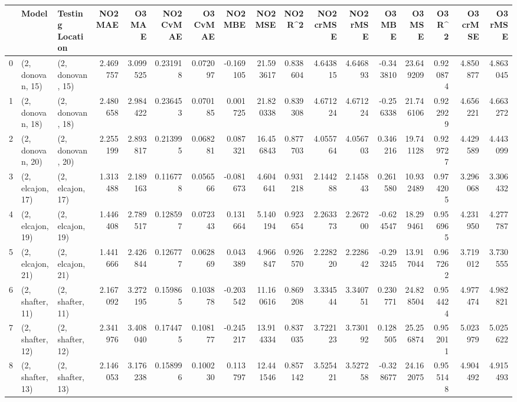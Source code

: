\begin{tabular}{lllrrrrrrrrrrrrrr}
\toprule
{} &             Model &  Testing Location &   NO2 MAE &    O3 MAE &  NO2 CvMAE &  O3 CvMAE &   NO2 MBE &    NO2 MSE &   NO2 R\textasciicircum2 &  NO2 crMSE &  NO2 rMSE &    O3 MBE &     O3 MSE &    O3 R\textasciicircum2 &  O3 crMSE &   O3 rMSE \\
\midrule
0  &  (2, donovan, 15) &  (2, donovan, 15) &  2.469757 &  3.099525 &   0.231918 &  0.072097 & -0.169105 &  21.593617 &  0.838604 &   4.643815 &  4.646893 & -0.343810 &  23.649209 &  0.920874 &  4.850877 &  4.863045 \\
1  &  (2, donovan, 18) &  (2, donovan, 18) &  2.480658 &  2.984422 &   0.236453 &  0.070185 &  0.001725 &  21.820338 &  0.839308 &   4.671224 &  4.671224 & -0.256338 &  21.746106 &  0.922929 &  4.656221 &  4.663272 \\
2  &  (2, donovan, 20) &  (2, donovan, 20) &  2.255199 &  2.893817 &   0.213995 &  0.068281 &  0.087321 &  16.456843 &  0.877703 &   4.055764 &  4.056703 &  0.346216 &  19.741128 &  0.929727 &  4.429589 &  4.443099 \\
3  &  (2, elcajon, 17) &  (2, elcajon, 17) &  1.313488 &  2.189163 &   0.116778 &  0.056566 & -0.081673 &   4.604641 &  0.931218 &   2.144288 &  2.145843 &  0.261580 &  10.932489 &  0.974205 &  3.296068 &  3.306432 \\
4  &  (2, elcajon, 19) &  (2, elcajon, 19) &  1.446408 &  2.789517 &   0.128597 &  0.072343 &  0.131664 &   5.140194 &  0.923654 &   2.263373 &  2.267200 & -0.624547 &  18.299461 &  0.956965 &  4.231950 &  4.277787 \\
5  &  (2, elcajon, 21) &  (2, elcajon, 21) &  1.441666 &  2.426844 &   0.126777 &  0.062869 &  0.043389 &   4.966847 &  0.926570 &   2.228220 &  2.228642 & -0.293245 &  13.917044 &  0.967262 &  3.719012 &  3.730555 \\
6  &  (2, shafter, 11) &  (2, shafter, 11) &  2.167092 &  3.272195 &   0.159865 &  0.103878 & -0.203542 &  11.160616 &  0.869208 &   3.334544 &  3.340751 &  0.230771 &  24.828504 &  0.954424 &  4.977474 &  4.982821 \\
7  &  (2, shafter, 12) &  (2, shafter, 12) &  2.341976 &  3.408040 &   0.174475 &  0.108177 & -0.245217 &  13.914334 &  0.837035 &   3.722123 &  3.730192 &  0.128505 &  25.256874 &  0.952011 &  5.023979 &  5.025622 \\
8  &  (2, shafter, 13) &  (2, shafter, 13) &  2.146053 &  3.176238 &   0.158996 &  0.100230 &  0.113797 &  12.441546 &  0.857142 &   3.525421 &  3.527258 & -0.328677 &  24.162075 &  0.955148 &  4.904492 &  4.915493 \\

\end{tabular}
